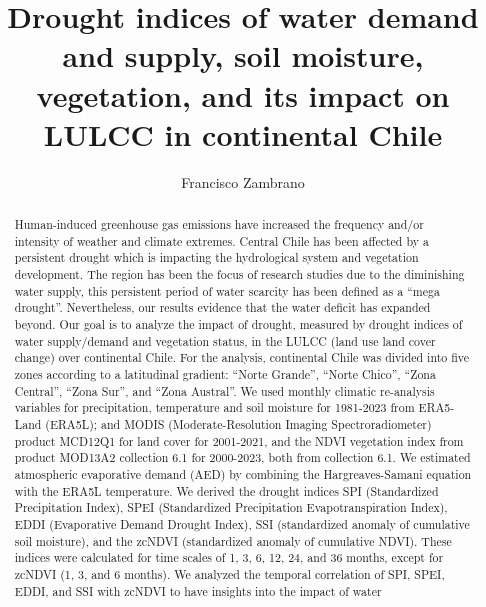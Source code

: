 \documentclass[
  authoryear,
  preprint,
  3p,
  onecolumn]{elsarticle}
\begin{document}
\begin{frontmatter}
\title{Drought indices of water demand and supply, soil moisture,
vegetation, and its impact on LULCC in continental Chile}
\author[1]{Francisco Zambrano%
%
}


        
\begin{abstract}
Human-induced greenhouse gas emissions have increased the frequency
and/or intensity of weather and climate extremes. Central Chile has been
affected by a persistent drought which is impacting the hydrological
system and vegetation development. The region has been the focus of
research studies due to the diminishing water supply, this persistent
period of water scarcity has been defined as a ``mega drought''.
Nevertheless, our results evidence that the water deficit has expanded
beyond. Our goal is to analyze the impact of drought, measured by
drought indices of water supply/demand and vegetation status, in the
LULCC (land use land cover change) over continental Chile. For the
analysis, continental Chile was divided into five zones according to a
latitudinal gradient: ``Norte Grande'', ``Norte Chico'', ``Zona
Central'', ``Zona Sur'', and ``Zona Austral''. We used monthly climatic
re-analysis variables for precipitation, temperature and soil moisture
for 1981-2023 from ERA5-Land (ERA5L); and MODIS (Moderate-Resolution
Imaging Spectroradiometer) product MCD12Q1 for land cover for 2001-2021,
and the NDVI vegetation index from product MOD13A2 collection 6.1 for
2000-2023, both from collection 6.1. We estimated atmospheric
evaporative demand (AED) by combining the Hargreaves-Samani equation
with the ERA5L temperature. We derived the drought indices SPI
(Standardized Precipitation Index), SPEI (Standardized Precipitation
Evapotranspiration Index), EDDI (Evaporative Demand Drought Index), SSI
(standardized anomaly of cumulative soil moisture), and the zcNDVI
(standardized anomaly of cumulative NDVI). These indices were calculated
for time scales of 1, 3, 6, 12, 24, and 36 months, except for zcNDVI (1,
3, and 6 months). We analyzed the temporal correlation of SPI, SPEI,
EDDI, and SSI with zcNDVI to have insights into the impact of water

\end{abstract}
\end{frontmatter}
\end{document}
